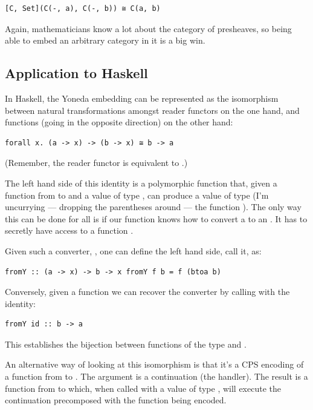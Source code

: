 \begin{verbatim}
[C, Set](C(-, a), C(-, b)) ≅ C(a, b)
\end{verbatim}

Again, mathematicians know a lot about the category of presheaves, so
being able to embed an arbitrary category in it is a big win.

\subsection{Application to Haskell}\label{application-to-haskell}

In Haskell, the Yoneda embedding can be represented as the isomorphism
between natural transformations amongst reader functors on the one hand,
and functions (going in the opposite direction) on the other hand:

\begin{verbatim}
forall x. (a -> x) -> (b -> x) ≅ b -> a
\end{verbatim}

(Remember, the reader functor is equivalent to
.)

The left hand side of this identity is a polymorphic function that,
given a function from  to  and a value of type
, can produce a value of type  (I'm uncurrying ---
dropping the parentheses around --- the function
). The only way this can be done for all
 is if our function knows how to convert a  to an
. It has to secretly have access to a function
.

Given such a converter, , one can define the left hand
side, call it, as:

\begin{verbatim}
fromY :: (a -> x) -> b -> x fromY f b = f (btoa b)
\end{verbatim}

Conversely, given a function  we can recover the converter
by calling  with the identity:

\begin{verbatim}
fromY id :: b -> a
\end{verbatim}

This establishes the bijection between functions of the type
 and .

An alternative way of looking at this isomorphism is that it's a CPS
encoding of a function from  to . The argument
 is a continuation (the handler). The result
is a function from  to  which, when called with a
value of type , will execute the continuation precomposed with
the function being encoded.

